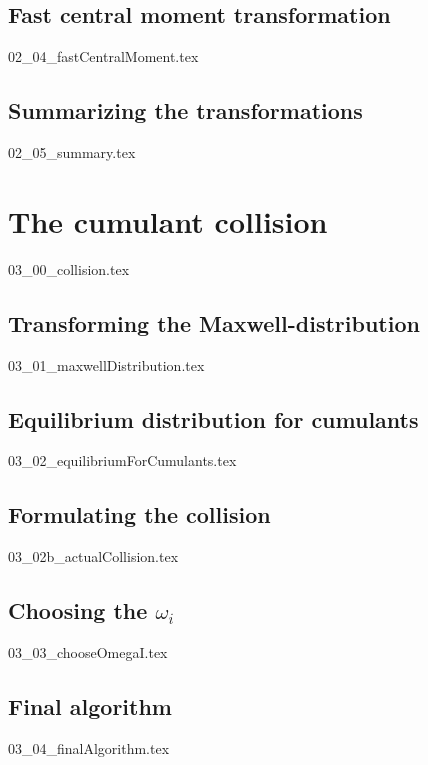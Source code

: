 \documentclass[12pt,a4paper,twoside]{article}
\begin{document}
\subsection{Fast central moment transformation}
\label{sub: Fast central moment transformation}
{02_04_fastCentralMoment.tex}

\subsection{Summarizing the transformations}
\label{sub: Summarizing the transformations}
{02_05_summary.tex}

\section{The cumulant collision}
\label{sec: The cumulant collision}
{03_00_collision.tex}

\subsection{Transforming the Maxwell-distribution}
\label{sub: Transforming the Maxwell-distribution}
{03_01_maxwellDistribution.tex}

\subsection{Equilibrium distribution for cumulants}
\label{sub: Equilibrium distribution for cumulants}
{03_02_equilibriumForCumulants.tex}

\subsection{Formulating the collision}
\label{sub: Formulating the collision}
{03_02b_actualCollision.tex}

\subsection{Choosing the \texorpdfstring{$\omega_i$}{omega i}}
\label{sub: Choosing the omega i}
{03_03_chooseOmegaI.tex}

\subsection{Final algorithm}
\label{sub: Final algorithm}
{03_04_finalAlgorithm.tex}
\end{document}
